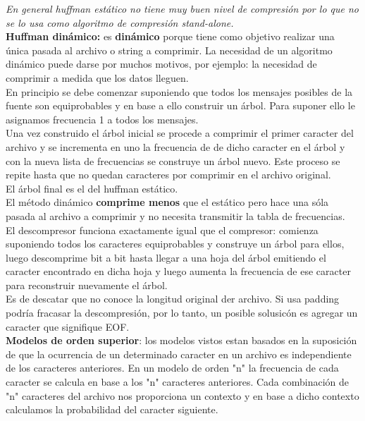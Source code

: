 \documentclass[titlepage,a4paper]{article}
\begin{document}
\textit{En general huffman estático no tiene muy buen nivel de compresión por lo que no se lo usa como algoritmo de compresión stand-alone.}\\

\textbf{Huffman dinámico:}  es \textbf{dinámico} porque tiene como objetivo realizar una única pasada al archivo o string a comprimir. La necesidad de un algoritmo dinámico puede darse por muchos motivos, por ejemplo: la necesidad de comprimir a medida que los datos lleguen. \\

En principio se debe comenzar suponiendo que todos los mensajes posibles de la fuente son equiprobables y en base a ello construir un árbol.  Para suponer ello le asignamos frecuencia 1 a todos los mensajes. \\

Una vez construido el árbol inicial se procede a comprimir el primer caracter del archivo y se incrementa en uno la frecuencia de de dicho caracter en el árbol y con la nueva lista de frecuencias se construye un árbol nuevo. Este proceso se repite hasta que no quedan caracteres por comprimir en el archivo original.  \\

El árbol final es el del huffman estático.  \\

El método dinámico \textbf{comprime menos} que el estático pero hace una sóla pasada al archivo a comprimir y no necesita transmitir la tabla de frecuencias. \\

El descompresor funciona exactamente igual que el compresor: comienza suponiendo todos los caracteres equiprobables y construye un árbol  para ellos, luego descomprime bit a bit hasta llegar a una hoja del árbol emitiendo el caracter encontrado en dicha hoja y luego aumenta la frecuencia de ese caracter para reconstruir nuevamente el árbol. \\

Es de descatar que no conoce la longitud original der archivo. Si usa padding podría fracasar la descompresión, por lo tanto, un posible solusicón es agregar un caracter que signifique EOF. \\

\textbf{Modelos de orden superior}: los modelos vistos estan  basados en la suposición de que la ocurrencia de un determinado caracter en un archivo es independiente de los caracteres anteriores.  En un modelo de orden "n" la frecuencia de cada caracter se calcula en base a los "n" caracteres anteriores. Cada combinación de "n" caracteres del archivo nos proporciona un contexto y en base a dicho contexto calculamos la probabilidad del caracter siguiente. \\ 
\end{document}
